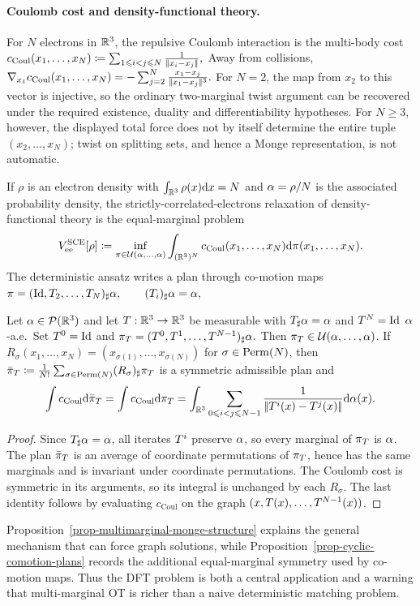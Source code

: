 \paragraph{Coulomb cost and density-functional theory.}
For $N$ electrons in $\mathbb{R}^3$, the repulsive Coulomb interaction is the multi-body cost
\(c_{\mathrm{Coul}}(x_1,\ldots,x_N) \coloneqq \sum_{1\leqslant i<j\leqslant N}\frac{1}{|\!| x_i-x_j |\!|},\)
Away from collisions, \(\nabla_{x_1}c_{\mathrm{Coul}}(x_1,\ldots,x_N) = -\sum_{j=2}^N\frac{x_1-x_j}{|\!| x_1-x_j |\!|^3}.\)
For $N=2$, the map from $x_2$ to this vector is injective, so the ordinary two-marginal twist argument can be recovered under the required existence, duality and differentiability hypotheses. For $N\geq3$, however, the displayed total force does not by itself determine the entire tuple $(x_2,\ldots,x_N)$; twist on splitting sets, and hence a Monge representation, is not automatic.

If $\rho$ is an electron density with $\int_{\mathbb{R}^3}\rho(x)\mathrm{d} x=N$ and $\alpha=\rho/N$ is the associated probability density, the strictly-correlated-electrons relaxation of density-functional theory is the equal-marginal problem
\[
V_{\mathrm{ee}}^{\mathrm{SCE}}[\rho]
\coloneqq
\inf_{\pi\in\mathcal{U}(\alpha,\ldots,\alpha)}
\int_{(\mathbb{R}^3)^N}
c_{\mathrm{Coul}}(x_1,\ldots,x_N)
\mathrm{d}\pi(x_1,\ldots,x_N).
\]
The deterministic ansatz writes a plan through co-motion maps
\(\pi=(\mathrm{Id},T_2,\ldots,T_N)_\sharp\alpha, \qquad (T_i)_\sharp\alpha=\alpha,\)
\begin{prop}\label{prop-cyclic-comotion-plans}
Let $\alpha\in\mathcal{P}(\mathbb{R}^3)$ and let $T:\mathbb{R}^3\to\mathbb{R}^3$ be measurable with $T_\sharp\alpha=\alpha$ and $T^N=\mathrm{Id}$ $\alpha$-a.e.\ Set $T^0=\mathrm{Id}$ and
\(\pi_T=(T^0,T^1,\ldots,T^{N-1})_\sharp\alpha.\)
Then $\pi_T\in\mathcal{U}(\alpha,\ldots,\alpha)$. If $R_\sigma(x_1,\ldots,x_N)=(x_{\sigma(1)},\ldots,x_{\sigma(N)})$ for $\sigma\in\mathrm{Perm}(N)$, then
\(\bar\pi_T\coloneqq\frac1{N!}\sum_{\sigma\in\mathrm{Perm}(N)}(R_\sigma)_\sharp\pi_T\)
is a symmetric admissible plan and
\[
\int c_{\mathrm{Coul}}\mathrm{d}\bar\pi_T
=
\int c_{\mathrm{Coul}}\mathrm{d}\pi_T
=
\int_{\mathbb{R}^3}
\sum_{0\leqslant i<j\leqslant N-1}
\frac{1}{|\!| T^i(x)-T^j(x) |\!|}\mathrm{d}\alpha(x).
\]
\end{prop}
\begin{proof}
Since $T_\sharp\alpha=\alpha$, all iterates $T^i$ preserve $\alpha$, so every marginal of $\pi_T$ is $\alpha$. The plan $\bar\pi_T$ is an average of coordinate permutations of $\pi_T$, hence has the same marginals and is invariant under coordinate permutations. The Coulomb cost is symmetric in its arguments, so its integral is unchanged by each $R_\sigma$. The last identity follows by evaluating $c_{\mathrm{Coul}}$ on the graph $(x,T(x),\ldots,T^{N-1}(x))$.
\end{proof}
Proposition~\ref{prop-multimarginal-monge-structure} explains the general mechanism that can force graph solutions, while Proposition~\ref{prop-cyclic-comotion-plans} records the additional equal-marginal symmetry used by co-motion maps. Thus the DFT problem is both a central application and a warning that multi-marginal OT is richer than a naive deterministic matching problem.

